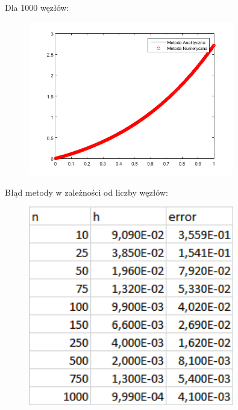 \begin{samepage}
	Dla 1000 węzłów:
	
	\begin{figure}[!ht]
		\begin{center}
			\includegraphics[width=0.8\textwidth]{Lab4/charts/zad4/1/1000.png}
		\end{center}
	\end{figure}
	\FloatBarrier
\end{samepage}    

\newpage

\begin{samepage}
	Błąd metody w zależności od liczby węzłów:
	\begin{figure}[!ht]
		\begin{center}
			\includegraphics[width=0.8\textwidth]{Lab4/charts/zad4/1/error_dane.png}
		\end{center}
	\end{figure}
	\FloatBarrier
\end{samepage} 

